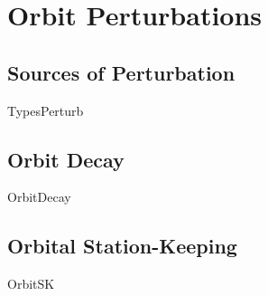 \chapter{Orbit Perturbations}
\label{ch:Pert}

\section{Sources of Perturbation}
{TypesPerturb}


\section{Orbit Decay}
{OrbitDecay}

\section{Orbital Station-Keeping}
{OrbitSK}
